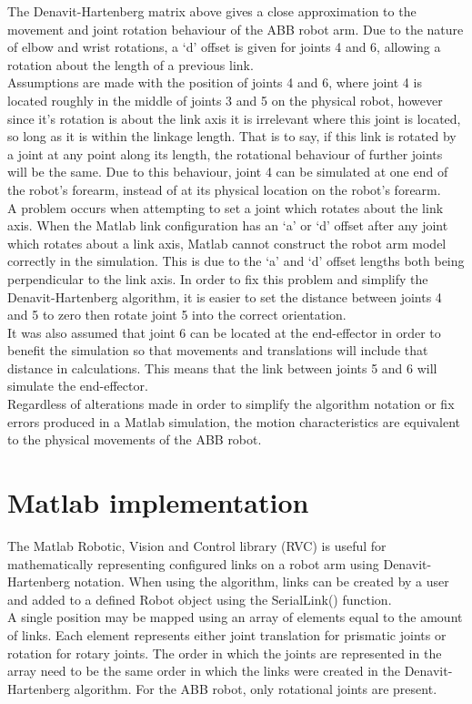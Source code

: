 \documentclass[11pt,a4paper]{report}
\begin{document}
The Denavit-Hartenberg matrix above gives a close approximation to the movement and joint rotation behaviour of the ABB robot arm. Due to the nature of elbow and wrist rotations, a `d' offset is given for joints 4 and 6, allowing a rotation about the length of a previous link.\\
Assumptions are made with the position of joints 4 and 6, where joint 4 is located roughly in the middle of joints 3 and 5 on the physical robot, however since it's rotation is about the link axis it is irrelevant where this joint is located, so long as it is within the linkage length. That is to say, if this link is rotated by a joint at any point along its length, the rotational behaviour of further joints will be the same. Due to this behaviour, joint 4 can be simulated at one end of the robot's forearm, instead of at its physical location on the robot's forearm.\\
A problem occurs when attempting to set a joint which rotates about the link axis. When the Matlab link configuration has an `a' or `d' offset after any joint which rotates about a link axis, Matlab cannot construct the robot arm model correctly in the simulation. This is due to the `a' and `d' offset lengths both being perpendicular to the link axis. In order to fix this problem and simplify the Denavit-Hartenberg algorithm, it is easier to set the distance between joints 4 and 5 to zero then rotate joint 5 into the correct orientation.\\
It was also assumed that joint 6 can be located at the end-effector in order to benefit the simulation so that movements and translations will include that distance in calculations. This means that the link between joints 5 and 6 will simulate the end-effector.\\
Regardless of alterations made in order to simplify the algorithm notation or fix errors produced in a Matlab simulation, the motion characteristics are equivalent to the physical movements of the ABB robot.

\section{Matlab implementation}
The Matlab Robotic, Vision and Control library (RVC) is useful for mathematically representing configured links on a robot arm using Denavit-Hartenberg notation. When using the algorithm, links can be created by a user and added to a defined Robot object using the SerialLink() function.\\
A single position may be mapped using an array of elements equal to the amount of links. Each element represents either joint translation for prismatic joints or rotation for rotary joints. The order in which the joints are represented in the array need to be the same order in which the links were created in the Denavit-Hartenberg algorithm. For the ABB robot, only rotational joints are present.\\
\end{document}
